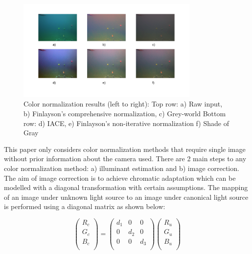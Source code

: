 \documentclass[fypca]{socreport}
\begin{document}
\begin{figure}[H]
\centering
  \includegraphics[width=0.8\textwidth, height=0.3\textheight]{color_constancy.png}
  \caption{Color normalization results (left to right): \newline Top row:
  a) Raw input, b) Finlayson's comprehensive normalization, c) Grey-world \newline Bottom
  row: d) IACE, e) Finlayson's non-iterative normalization f) Shade of Gray}
  \label{fig:colorconstancy_results}
\end{figure}

This paper only considers color normalization methods that require single image
without prior information about the camera used. There are 2 main steps to any
color normalization method: a) illuminant estimation and b) image correction.
The aim of image correction is to achieve chromatic adaptation which can be
modelled with a diagonal transformation  with certain assumptions.
The mapping of an image under unknown light source to an image under canonical
light source is performed using a diagonal matrix as shown below:

\[
\begin{pmatrix}
  R_c \\
  G_c \\
  B_c \\
\end{pmatrix}
=
\begin{pmatrix}
  d_1 & 0 & 0 \\
  0 & d_2 & 0 \\
  0 & 0 & d_3\\
\end{pmatrix}
\begin{pmatrix}
  R_u \\
  G_u \\
  B_u \\
\end{pmatrix}
\]
\end{document}
